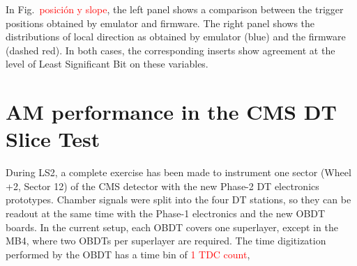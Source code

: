 \documentclass[../main.tex]{subfiles}
\begin{document}
In Fig.~\textcolor{red}{posición y slope}, the left panel shows a comparison between the trigger positions obtained by emulator and firmware. The right panel shows the distributions of local direction as obtained by emulator (blue) and the firmware (dashed red). In both cases, the corresponding inserts show agreement at the level of Least Significant Bit on these variables.


\section{AM performance in the CMS DT Slice Test}

During LS2, a complete exercise has been made to instrument one sector (Wheel +2, Sector 12) of the CMS detector with the new Phase-2 DT electronics prototypes. Chamber signals were split into the four DT stations, so they can be readout at the same time with the Phase-1 electronics and the new OBDT boards. In the current setup, each OBDT covers one superlayer, except in the MB4, where two OBDTs per superlayer are required. The time digitization performed by the OBDT has a time bin of \textcolor{red}{1 TDC count}, 







%
%
\end{document}
